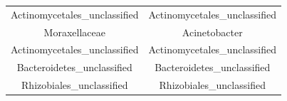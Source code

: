 \documentclass[]{article}
\begin{document}
\begin{longtable}[]{@{}cc@{}}
\begin{minipage}[t]{0.41\columnwidth}\centering
Actinomycetales\_unclassified\strut
\end{minipage} & \begin{minipage}[t]{0.41\columnwidth}\centering
Actinomycetales\_unclassified\strut
\end{minipage}\tabularnewline
\begin{minipage}[t]{0.41\columnwidth}\centering
Moraxellaceae\strut
\end{minipage} & \begin{minipage}[t]{0.41\columnwidth}\centering
Acinetobacter\strut
\end{minipage}\tabularnewline
\begin{minipage}[t]{0.41\columnwidth}\centering
Actinomycetales\_unclassified\strut
\end{minipage} & \begin{minipage}[t]{0.41\columnwidth}\centering
Actinomycetales\_unclassified\strut
\end{minipage}\tabularnewline
\begin{minipage}[t]{0.41\columnwidth}\centering
Bacteroidetes\_unclassified\strut
\end{minipage} & \begin{minipage}[t]{0.41\columnwidth}\centering
Bacteroidetes\_unclassified\strut
\end{minipage}\tabularnewline
\begin{minipage}[t]{0.41\columnwidth}\centering
Rhizobiales\_unclassified\strut
\end{minipage} & \begin{minipage}[t]{0.41\columnwidth}\centering
Rhizobiales\_unclassified\strut
\end{minipage}\tabularnewline
\bottomrule
\end{longtable}
\end{document}
